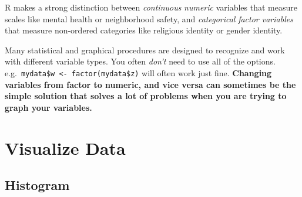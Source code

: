 \documentclass[
  letterpaper,
  DIV=11,
  numbers=noendperiod]{scrartcl}
\newenvironment{Shaded}{\begin{snugshade}}{\end{snugshade}}
\newcommand{\AttributeTok}[1]{\textcolor[rgb]{0.40,0.45,0.13}{#1}}
\newcommand{\CommentTok}[1]{\textcolor[rgb]{0.37,0.37,0.37}{#1}}
\newcommand{\ConstantTok}[1]{\textcolor[rgb]{0.56,0.35,0.01}{#1}}
\newcommand{\DecValTok}[1]{\textcolor[rgb]{0.68,0.00,0.00}{#1}}
\newcommand{\FunctionTok}[1]{\textcolor[rgb]{0.28,0.35,0.67}{#1}}
\newcommand{\NormalTok}[1]{\textcolor[rgb]{0.00,0.23,0.31}{#1}}
\newcommand{\OtherTok}[1]{\textcolor[rgb]{0.00,0.23,0.31}{#1}}
\newcommand{\SpecialCharTok}[1]{\textcolor[rgb]{0.37,0.37,0.37}{#1}}
\newcommand{\StringTok}[1]{\textcolor[rgb]{0.13,0.47,0.30}{#1}}
\begin{document}
R makes a strong distinction between \emph{continuous} \emph{numeric}
variables that measure scales like mental health or neighborhood safety,
and \emph{categorical} \emph{factor variables} that measure non-ordered
categories like religious identity or gender identity.

Many statistical and graphical procedures are designed to recognize and
work with different variable types. You often \emph{don't} need to use
all of the options.
e.g.~\texttt{mydata\$w\ \textless{}-\ factor(mydata\$z)} will often work
just fine. \textbf{Changing variables from factor to numeric, and vice
versa can sometimes be the simple solution that solves a lot of problems
when you are trying to graph your variables.}

\begin{Shaded}
\end{Shaded}

\hypertarget{visualize-data}{%
\section{Visualize Data}\label{visualize-data}}

\hypertarget{histogram}{%
\subsection{Histogram}\label{histogram}}

\begin{Shaded}
\end{Shaded}
\end{document}
